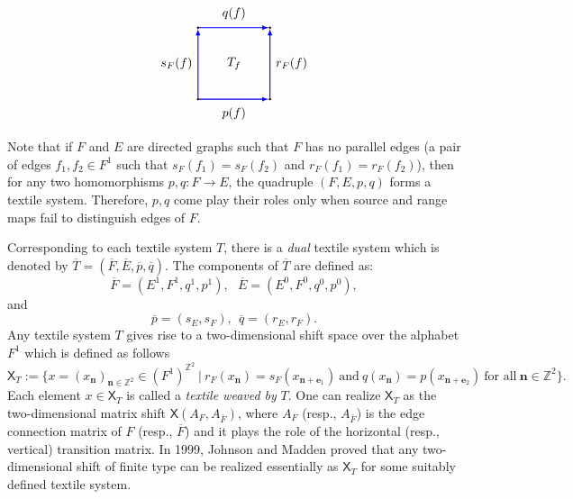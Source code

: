 \documentclass[a4paper,reqno,12pt]{amsart}
\newcommand{\N}{\mathbf{n}}
\theoremstyle{definition}
\theoremstyle{remark}
\begin{document}
\[
\begin{tikzpicture}[scale=2.0]
\node[inner sep=0.5pt, circle,draw,fill=black] (A1) at (0,0) {};
\node[inner sep=0.5pt, circle,draw,fill=black] (A2) at (1,0) {};
\node[inner sep=0.5pt, circle,draw,fill=black] (A3) at (0,1) {};
\node[inner sep=0.5pt, circle,draw,fill=black] (A4) at (1,1) {};


\path[->,blue, >=latex,thick] (A1) edge [] node[]{} (A2);
\path[->,blue, >=latex,thick] (A1) edge [] node[]{} (A3);
\path[->,blue, >=latex,thick] (A2) edge [] node[]{} (A4);
\path[->,blue, >=latex,thick] (A3) edge [] node[]{} (A4);

\node at (0.5,-0.2) {$p(f)$};
\node at (0.5,1.2) {$q(f)$};
\node at (-0.3,0.5) {$s_F(f)$};
\node at (1.3,0.5) {$r_F(f)$};

\node at (0.5,0.5) {$T_f$};
\end{tikzpicture}
\]
Note that if $F$ and $E$ are directed graphs such that $F$ has no parallel edges (a pair of edges $f_1,f_2\in F^1$ such that $s_F(f_1)=s_F(f_2)$ and $r_F(f_1)=r_F(f_2)$), then for any two homomorphisms $p,q:F\longrightarrow E$, the quadruple $(F,E,p,q)$ forms a textile system. Therefore, $p,q$ come play their roles only when source and range maps fail to distinguish edges of $F$. 

Corresponding to each textile system $T$, there is a \emph{dual} textile system which is denoted by $\overline{T}=(\overline{F},\overline{E},\overline{p},\overline{q})$. The components of $\overline{T}$ are defined as: \[\overline{F}=(E^1,F^1,q^1,p^1),~~~ \overline{E}=(E^0,F^0,q^0,p^0),\] and  \[\overline{p}=(s_E,s_F),~~\overline{q}=(r_E,r_F).\] Any textile system $T$ gives rise to a two-dimensional shift space over the alphabet $F^1$ which is defined as follows
\[ \mathsf{X}_T:=\{x=(x_\N)_{\N\in \mathbb{Z}^2}\in (F^1)^{\mathbb{Z}^2}~|~r_F(x_\mathbf{n})=s_F(x_{\mathbf{n}+\mathbf{e}_1})~\text{and}~q(x_\mathbf{n})=p(x_{\mathbf{n}+\mathbf{e}_2})~\text{for all}~\mathbf{n}\in \mathbb{Z}^2\}.\] Each element $x\in \mathsf{X}_T$ is called a \emph{textile weaved by} $T$. One can realize $\mathsf{X}_T$ as the two-dimensional matrix shift $\mathsf{X}(A_F,A_{\overline{F}})$, where $A_F$ (resp., $A_{\overline{F}}$) is the edge connection matrix of $F$ (resp., $\overline{F}$) and it plays the role of the horizontal (resp., vertical) transition matrix. In 1999, Johnson and Madden \cite{JM} proved that any two-dimensional shift of finite type can be realized essentially as $\mathsf{X}_T$ for some suitably defined textile system. 
\end{document}
